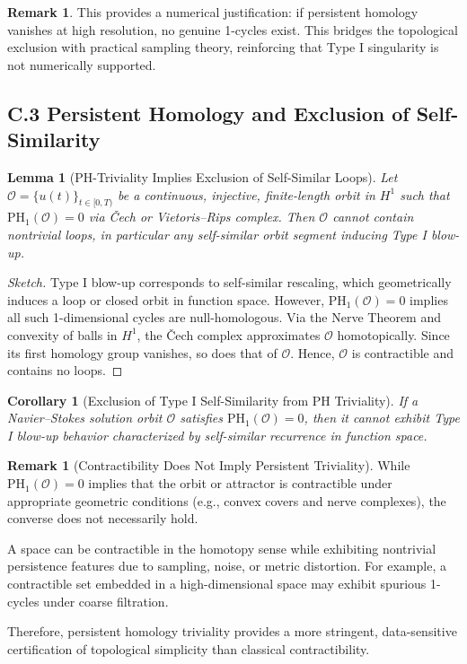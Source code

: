 \documentclass[11pt]{article}
\newtheorem{lemma}[theorem]{Lemma}
\newtheorem{corollary}[theorem]{Corollary}
\theoremstyle{definition}
\newtheorem{remark}[theorem]{Remark}
\begin{document}
\begin{remark}
This provides a numerical justification: if persistent homology vanishes at high resolution, no genuine 1-cycles exist. This bridges the topological exclusion with practical sampling theory, reinforcing that Type I singularity is not numerically supported.
\end{remark}

\subsection*{C.3 Persistent Homology and Exclusion of Self-Similarity}

\begin{lemma}[PH-Triviality Implies Exclusion of Self-Similar Loops]
Let \( \mathcal{O} = \{u(t)\}_{t \in [0,T)} \) be a continuous, injective, finite-length orbit in \( H^1 \) such that \( \mathrm{PH}_1(\mathcal{O}) = 0 \) via Čech or Vietoris–Rips complex. Then \( \mathcal{O} \) cannot contain nontrivial loops, in particular any self-similar orbit segment inducing Type I blow-up.
\end{lemma}

\begin{proof}[Sketch]
Type I blow-up corresponds to self-similar rescaling, which geometrically induces a loop or closed orbit in function space. However, \( \mathrm{PH}_1(\mathcal{O}) = 0 \) implies all such 1-dimensional cycles are null-homologous. Via the Nerve Theorem and convexity of balls in \( H^1 \), the Čech complex approximates \( \mathcal{O} \) homotopically. Since its first homology group vanishes, so does that of \( \mathcal{O} \). Hence, \( \mathcal{O} \) is contractible and contains no loops.
\end{proof}

\begin{corollary}[Exclusion of Type I Self-Similarity from PH Triviality]
If a Navier–Stokes solution orbit \( \mathcal{O} \) satisfies \( \mathrm{PH}_1(\mathcal{O}) = 0 \), then it cannot exhibit Type I blow-up behavior characterized by self-similar recurrence in function space.
\end{corollary}

\begin{remark}[Contractibility Does Not Imply Persistent Triviality]
While $\mathrm{PH}_1(\mathcal{O}) = 0$ implies that the orbit or attractor is contractible under appropriate geometric conditions (e.g., convex covers and nerve complexes), the converse does not necessarily hold.

A space can be contractible in the homotopy sense while exhibiting nontrivial persistence features due to sampling, noise, or metric distortion. For example, a contractible set embedded in a high-dimensional space may exhibit spurious 1-cycles under coarse filtration.

Therefore, persistent homology triviality provides a more stringent, data-sensitive certification of topological simplicity than classical contractibility.
\end{remark}
\end{document}
